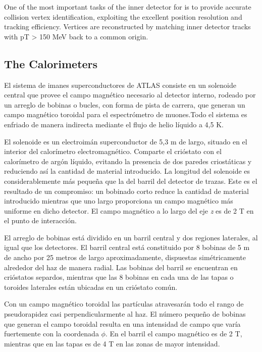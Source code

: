 One of the most important tasks of the inner detector for is to provide accurate collision vertex identification, exploiting the excellent position resolution and tracking efficiency. Vertices are reconstructed by matching inner detector tracks with pT > 150 MeV back to a common origin.%

\subsection{The Calorimeters}\label{sec:atlasCALO}
 El sistema de imanes superconductores de ATLAS consiste en un solenoide central que provee el campo magn\'etico necesario al detector interno, rodeado por un arreglo de bobinas o bucles, con forma de pista de carrera, que generan un campo magn\'etico toroidal para el espectr\'ometro de muones.Todo el sistema es enfriado de manera indirecta mediante el flujo de helio l\'iquido a 4,5 K.

   El solenoide es un electroim\'an superconductor de 5,3 m de largo, situado en el interior del calor\'imetro electromagn\'etico. Comparte el cri\'ostato con el calor\'imetro de arg\'on l\'iquido, evitando la presencia de dos paredes criost\'aticas y reduciendo as\'i la cantidad de material introducido. La longitud del solenoide es considerablemente m\'as peque\~na que la del barril del detector de trazas. Este es el resultado de un compromiso: un bobinado corto reduce la cantidad de material introducido mientras que uno largo proporciona un campo magn\'etico m\'as uniforme en dicho detector. El campo magn\'etico a lo largo del eje \emph{z} es de 2 T en el punto de interacci\'on.

   El arreglo de bobinas est\'a dividido en un barril central y dos regiones laterales, al igual que los detectores. El barril central est\'a constituido por 8 bobinas de 5 m de ancho por 25 metros de largo aproximadamente, dispuestas sim\'etricamente alrededor del haz de manera radial. Las bobinas del barril se encuentran en cri\'ostatos separdos, mientras que las 8 bobinas en cada una de las tapas o toroides laterales est\'an ubicadas en un cri\'ostato com\'un.

   Con un campo magn\'etico toroidal las part\'iculas atravesar\'an todo el rango de pseudorapidez casi perpendicularmente al haz. El n\'umero peque\~no de bobinas que generan el campo toroidal resulta en una intensidad de campo que var\'ia fuertemente con la coordenada $\phi$. En el barril el campo magn\'etico es de 2 T, mientras que en las tapas es de 4 T en las zonas de mayor intensidad.   


